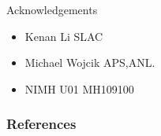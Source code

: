 \documentclass{beamer}
\begin{document}

\begin{frame}{Acknowledgements}
  \begin{itemize}
  \item \alert{Kenan Li} SLAC
  \item \alert{Michael Wojcik} APS,ANL.
  \item \alert{NIMH} U01 MH109100
  \end{itemize}
\end{frame}


\renewcommand*{\bibfont}{\scriptsize}
\begin{frame}[t, allowframebreaks]
\frametitle{References}


\end{frame}
\end{document}
